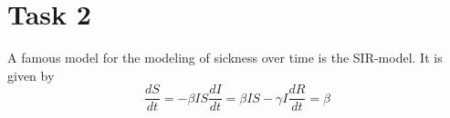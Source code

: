 \section{Task 2}
A famous model for the modeling of sickness over time is the SIR-model. It is given by
\begin{equation}
    \frac{dS}{dt} = -\beta I S
    \frac{dI}{dt} = \beta IS - \gamma I
    \frac{dR}{dt} = \beta
\end{equation}